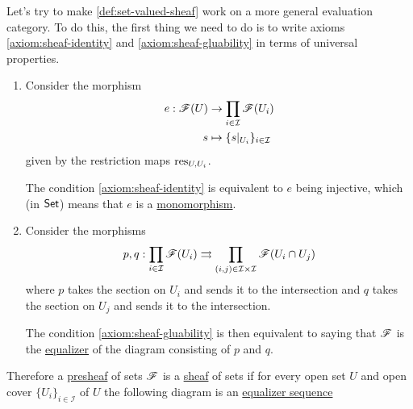 \documentclass[../../../main]{subfiles}
\begin{document}
Let's try to make \autoref{def:set-valued-sheaf} work on a more general evaluation category.
To do this, the first thing we need to do is to write axioms \ref{axiom:sheaf-identity} and \ref{axiom:sheaf-gluability} in terms of universal properties.
\begin{enumerate}[label=SH.\arabic*)]
  \item Consider the morphism
        \begin{align*}
          e: \mathscr{F}(U) &\to \prod_{i \in \mathcal{I}} \mathscr{F}(U_{i}) \\
          s &\mapsto \{s|_{U_{i}}\}_{i \in \mathcal{I}}
        \end{align*}
        given by the restriction maps \(\operatorname{res}_{U, U_{i}}\).

        The condition \ref{axiom:sheaf-identity} is equivalent to \(e\) being injective, which (in \(\mathsf{Set}\)) means that \(e\) is a \hyperref[def:mono-epi-morphism]{monomorphism}.
  \item Consider the morphisms
        \begin{align*}
          p, q: \prod_{i \in \mathcal{I}} \mathscr{F}(U_{i}) \rightrightarrows \prod_{(i, j) \in \mathcal{I} \times \mathcal{I}} \mathscr{F}(U_{i} \cap U_{j})
        \end{align*}
        where \(p\) takes the section on \(U_{i}\) and sends it to the intersection and \(q\) takes the section on \(U_{j}\) and sends it to the intersection.

        The condition \ref{axiom:sheaf-gluability} is then equivalent to saying that \(\mathscr{F}\) is the \hyperref[def:equaliser]{equalizer} of the diagram consisting of \(p\) and \(q\).
\end{enumerate}
Therefore a \hyperref[def:presheaf]{presheaf} of sets \(\mathscr{F}\) is a \hyperref[def:sheaf]{sheaf} of sets if for every open set \(U\) and open cover \(\{U_{i}\}_{i \in \mathcal{I}}\) of \(U\) the following diagram is an \hyperref[def:equaliser]{equalizer sequence}
\begin{center}
\end{center}
\end{document}

